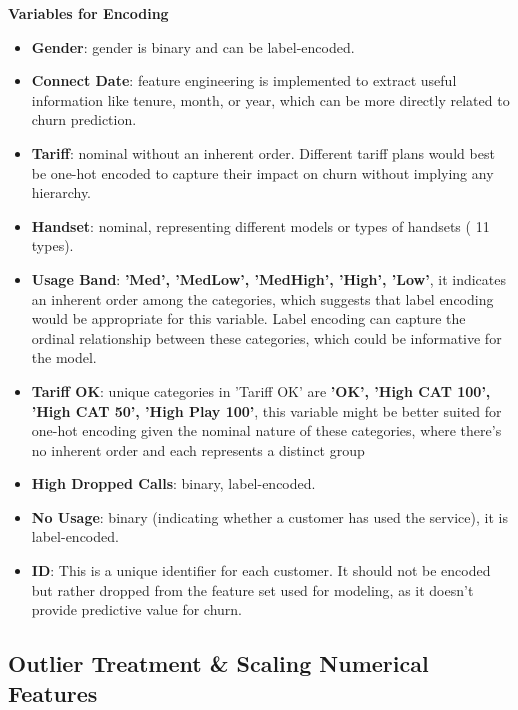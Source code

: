 \documentclass{article}
\begin{document}
\textbf{Variables for Encoding}
\begin{itemize}
    \item \textbf{Gender}: gender is binary and can be label-encoded.


 \item \textbf{Connect Date}: feature engineering is implemented to extract useful information like tenure, month, or year, which can be more directly related to churn prediction.

 \item \textbf{Tariff}: nominal without an inherent order. Different tariff plans would best be one-hot encoded to capture their impact on churn without implying any hierarchy.


     \item \textbf{Handset}: nominal, representing different models or types of handsets ( 11 types).


     \item \textbf{Usage Band}: \textbf{'Med', 'MedLow', 'MedHigh', 'High', 'Low'}, it indicates an inherent order among the categories, which suggests that label encoding would be appropriate for this variable. Label encoding can capture the ordinal relationship between these categories, which could be informative for the model.

    
\item \textbf{Tariff OK}: unique categories in 'Tariff OK' are \textbf{'OK', 'High CAT 100', 'High CAT 50', 'High Play 100'}, this variable might be better suited for one-hot encoding given the nominal nature of these categories, where there's no inherent order and each represents a distinct group

\item \textbf{High Dropped Calls}: binary,  label-encoded.

\item \textbf{No Usage}: binary (indicating whether a customer has used the service), it is label-encoded.

\item \textbf{ID}: This is a unique identifier for each customer. It should not be encoded but rather dropped from the feature set used for modeling, as it doesn't provide predictive value for churn.


\end{itemize}


\subsection{Outlier Treatment \& Scaling Numerical Features}
\end{document}
